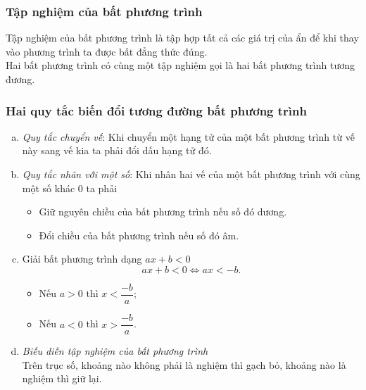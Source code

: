 	\subsubsection{Tập nghiệm của bất phương trình} Tập nghiệm của bất phương trình là tập hợp tất cả các giá trị của ẩn để khi thay vào phương trình ta được bất đẳng thức đúng.\\
	Hai bất phương trình có cùng một tập nghiệm gọi là hai bất phương trình tương đương.
	\subsubsection{Hai quy tắc biến đổi tương đường bất phương trình}
	\begin{enumerate}[a)]
				\item \textit{Quy tắc chuyển vế}: Khi chuyển một hạng tử của một bất phương trình từ vế này sang vế kia ta phải đổi  dấu hạng tử đó.
				\item \textit{Quy tắc nhân với một số}: Khi nhân hai vế của một bất phương trình với cùng một số khác $0$ ta phải
				\begin{itemize}
					\item Giữ nguyên chiều của bất phương trình nếu số đó dương.
					\item Đổi chiều của bất phương trình nếu số đó âm.
				\end{itemize}
			\item Giải bất phương trình dạng $ax+b<0$
			$$ax+b<0 \Leftrightarrow ax<-b.$$
			\begin{itemize}
				\item Nếu $a>0$ thì $x<\dfrac{-b}{a}$;
				\item Nếu $a<0$ thì $x>\dfrac{-b}{a}$.
			\end{itemize}
		\item \textit{Biếu diễn tập nghiệm của bất phương trình}\\
		Trên trục số, khoảng nào không phải là nghiệm thì gạch bỏ, khoảng nào là nghiệm thì giữ lại.
	\end{enumerate}

